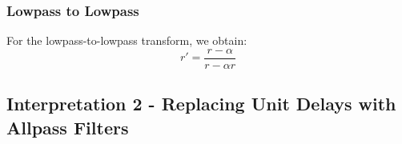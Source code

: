 \subsubsection{Lowpass to Lowpass}
For the lowpass-to-lowpass transform, we obtain:
\begin{equation}
 r' = \frac{r - \alpha}{r - \alpha r}
\end{equation}


\subsection{Interpretation 2 - Replacing Unit Delays with Allpass Filters}




